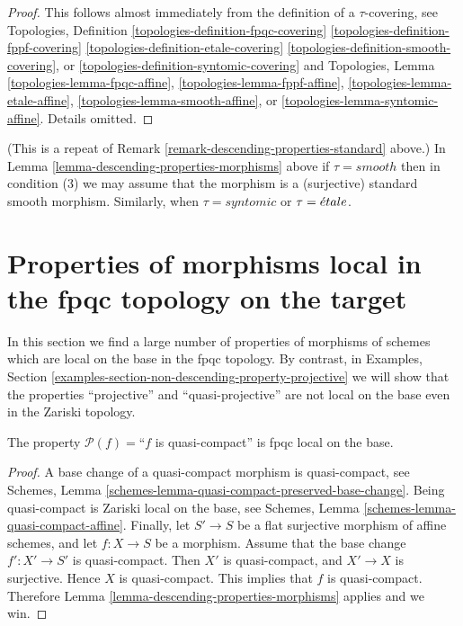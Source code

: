 \begin{proof}
This follows almost immediately from the definition of
a $\tau$-covering, see
Topologies, Definition
\ref{topologies-definition-fpqc-covering}
\ref{topologies-definition-fppf-covering}
\ref{topologies-definition-etale-covering}
\ref{topologies-definition-smooth-covering}, or
\ref{topologies-definition-syntomic-covering}
and Topologies, Lemma
\ref{topologies-lemma-fpqc-affine},
\ref{topologies-lemma-fppf-affine},
\ref{topologies-lemma-etale-affine},
\ref{topologies-lemma-smooth-affine}, or
\ref{topologies-lemma-syntomic-affine}.
Details omitted.
\end{proof}

\begin{remark}
\label{remark-descending-properties-morphisms-standard}
(This is a repeat of Remark \ref{remark-descending-properties-standard} above.)
In Lemma \ref{lemma-descending-properties-morphisms} above if
$\tau = smooth$ then in condition (3) we may assume that
the morphism is a (surjective) standard smooth morphism.
Similarly, when $\tau = syntomic$ or $\tau = {\acute{e}tale}$.
\end{remark}




\section{Properties of morphisms local in the fpqc topology on the target}
\label{section-descending-properties-morphisms-fpqc}

\noindent
In this section we find a large number of properties
of morphisms of schemes which are local on the base
in the fpqc topology. By contrast, in
Examples, Section \ref{examples-section-non-descending-property-projective}
we will show that the properties ``projective'' and ``quasi-projective''
are not local on the base even in the Zariski topology.

\begin{lemma}
\label{lemma-descending-property-quasi-compact}
The property $\mathcal{P}(f) =$``$f$ is quasi-compact''
is fpqc local on the base.
\end{lemma}

\begin{proof}
A base change of a quasi-compact morphism is quasi-compact, see
Schemes, Lemma \ref{schemes-lemma-quasi-compact-preserved-base-change}.
Being quasi-compact is Zariski local on the base, see
Schemes, Lemma \ref{schemes-lemma-quasi-compact-affine}.
Finally, let
$S' \to S$ be a flat surjective morphism of affine schemes,
and let $f : X \to S$ be a morphism. Assume that the base change
$f' : X' \to S'$ is quasi-compact. Then $X'$ is quasi-compact,
and $X' \to X$ is surjective. Hence $X$ is quasi-compact.
This implies that $f$ is quasi-compact.
Therefore Lemma \ref{lemma-descending-properties-morphisms} applies and we win.
\end{proof}

